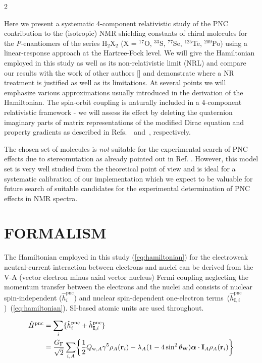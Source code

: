 \documentclass[a4paper,12pt,english]{article}
\begin{document}
\begin{spacing}{2}
\par Here we present a systematic 4-component relativistic study of the PNC contribution to the (isotropic) NMR shielding constants of chiral molecules for the \emph{P}-enantiomers of the series H$_2$X$_2$ (X = $^{17}$O, $^{33}$S, $^{77}$Se, $^{125}$Te, $^{209}$Po) using a linear-response approach at the Hartree-Fock level. We will give the Hamiltonian employed in this study as well as its non-relativistic limit (NRL) and compare our results with the work of other authors [\cite{berger2003chemphyschem}] and demonstrate where a NR treatment is justified as well as its limitations. At several points we will emphasize various approximations usually introduced in the derivation of the Hamiltonian. The spin-orbit coupling is naturally included in a 4-component relativistic framework - we will assess its effect by deleting the quaternion imaginary parts of matrix representations of the modified Dirac equation and property gradients as described in \mbox{Refs. \cite{saue2000jchemphys} and \cite{saue2005advquantumchem}}, respectively.

\par The chosen set of molecules is \emph{not} suitable for the experimental search of PNC effects due to stereomutation as already pointed out in Ref. \cite{berger2003chemphyschem}. However, this model set is very well studied from the theoretical point of view and is ideal for a systematic calibration of our implementation which we expect to be valuable for future search of suitable candidates for the experimental determination of PNC effects in NMR spectra.
\section{FORMALISM}
 
\noindent The Hamiltonian employed in this study (\ref{eq:hamiltonian}) for the electroweak neutral-current interaction between electrons and nuclei can be derived from the V-A (vector electron minus axial vector nucleus) Fermi coupling neglecting the momentum transfer between the electrons and the nuclei and consists of nuclear spin-independent ($\hat{h}^\text{pnc}_i$) and nuclear spin-dependent one-electron \mbox{terms ($\hat{h}^\text{pnc}_{\mathbf{I},i}$) (\ref{eq:hamiltonian})}. SI-based atomic units are used throughout.

\begin{align}
  \hat{H}^\text{pnc} &= \sum_i\{\hat{h}^\text{pnc}_i+\hat{h}^\text{pnc}_{\mathbf{I},i}\}\notag\\
                     &= \frac{G_\text{F}}{\sqrt{2}}\sum_{i,A}\biggl\{\frac{1}{2}Q_{\text{w},A}\gamma^5\rho_A(\mathbf{r}_i)-\lambda_A(1-4\sin^2\theta_\text{W})\boldsymbol{\alpha}\cdot\mathbf{I}_A\rho_A(\mathbf{r}_i)\biggr\}\label{eq:hamiltonian}
\end{align}


\end{spacing}
\end{document}
